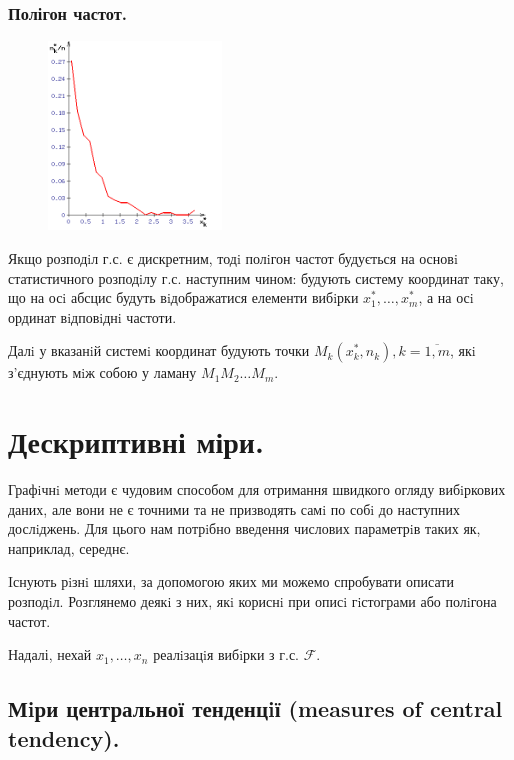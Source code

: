 \subsubsection{Полігон частот.}
\begin{figure}
\vspace*{-2em}
\centering
\includegraphics[width=0.41\textwidth]{assets/lectures_part_5-567b0078.png}
\end{figure}
Якщо розподiл г.с. є дискретним, тодi полiгон частот будується на основi статистичного
розподiлу г.с. наступним чином: будують систему координат таку, що на осi абсцис будуть вiдображатися елементи вибiрки $x_1^*, \dots , x_m^*$, а на осi ординат вiдповiднi частоти.\par Далi у вказанiй системi координат будують точки $M_k (x_k^*, n_k), k= \overline{1,m}$, якi з’єднують
мiж собою у ламану $M_1M_2\dots M_m$.
\newpage
\section{Дескриптивні міри.}
Графiчнi методи є чудовим способом для отримання швидкого огляду вибiркових даних, але
вони не є точними та не призводять самi по собi до наступних дослiджень. Для цього нам
потрiбно введення числових параметрiв таких як, наприклад, середнє.\par
Iснують рiзнi шляхи, за допомогою яких ми можемо спробувати описати розподiл. Розглянемо
деякi з них, якi кориснi при описi гiстограми або полiгона частот.\par
Надалі, нехай $x_1, \dots, x_n$ реалiзацiя вибiрки з г.с. $\mathcal{F}$.

\subsection{Мiри центральної тенденцiї (measures of central tendency).}
